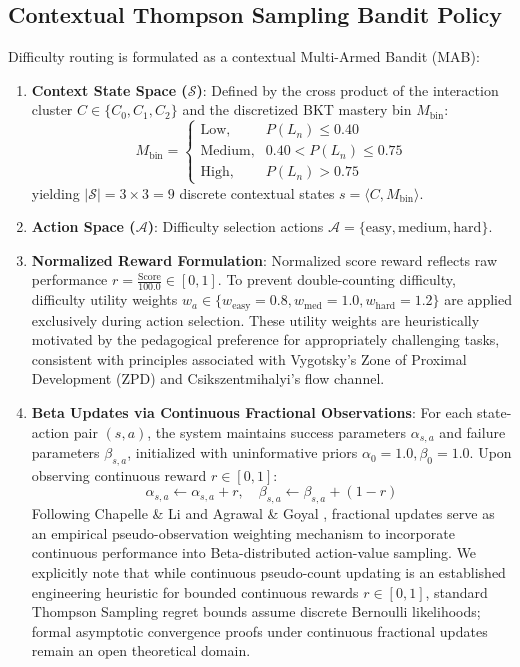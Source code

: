 \documentclass[journal]{IEEEtran}
\begin{document}
\subsection{Contextual Thompson Sampling Bandit Policy}
Difficulty routing is formulated as a contextual Multi-Armed Bandit (MAB):
\begin{enumerate}
    \item \textbf{Context State Space ($\mathcal{S}$)}: Defined by the cross product of the interaction cluster $C \in \{C_0, C_1, C_2\}$ and the discretized BKT mastery bin $M_{\text{bin}}$:
    \begin{equation}
    M_{\text{bin}} = \begin{cases}
    \text{Low}, & P(L_n) \le 0.40 \\
    \text{Medium}, & 0.40 < P(L_n) \le 0.75 \\
    \text{High}, & P(L_n) > 0.75
    \end{cases}
    \end{equation}
    yielding $|\mathcal{S}| = 3 \times 3 = 9$ discrete contextual states $s = \langle C, M_{\text{bin}} \rangle$.
    
    \item \textbf{Action Space ($\mathcal{A}$)}: Difficulty selection actions $\mathcal{A} = \{\text{easy}, \text{medium}, \text{hard}\}$.
    
    \item \textbf{Normalized Reward Formulation}: Normalized score reward reflects raw performance $r = \frac{\text{Score}}{100.0} \in [0, 1]$. To prevent double-counting difficulty, difficulty utility weights $w_a \in \{w_{\text{easy}}=0.8, w_{\text{med}}=1.0, w_{\text{hard}}=1.2\}$ are applied exclusively during action selection. These utility weights are heuristically motivated by the pedagogical preference for appropriately challenging tasks, consistent with principles associated with Vygotsky's Zone of Proximal Development (ZPD) and Csikszentmihalyi's flow channel.

    \item \textbf{Beta Updates via Continuous Fractional Observations}: For each state-action pair $(s, a)$, the system maintains success parameters $\alpha_{s,a}$ and failure parameters $\beta_{s,a}$, initialized with uninformative priors $\alpha_0 = 1.0, \beta_0 = 1.0$. Upon observing continuous reward $r \in [0, 1]$:
    \begin{equation}
    \alpha_{s,a} \leftarrow \alpha_{s,a} + r, \quad \beta_{s,a} \leftarrow \beta_{s,a} + (1 - r)
    \label{eq_bandit_update}
    \end{equation}
    Following Chapelle \& Li \cite{chapelle2011empirical} and Agrawal \& Goyal \cite{agrawal2012analysis}, fractional updates serve as an empirical pseudo-observation weighting mechanism to incorporate continuous performance into Beta-distributed action-value sampling. We explicitly note that while continuous pseudo-count updating is an established engineering heuristic for bounded continuous rewards $r \in [0, 1]$, standard Thompson Sampling regret bounds assume discrete Bernoulli likelihoods; formal asymptotic convergence proofs under continuous fractional updates remain an open theoretical domain.


\end{enumerate}
\end{document}
